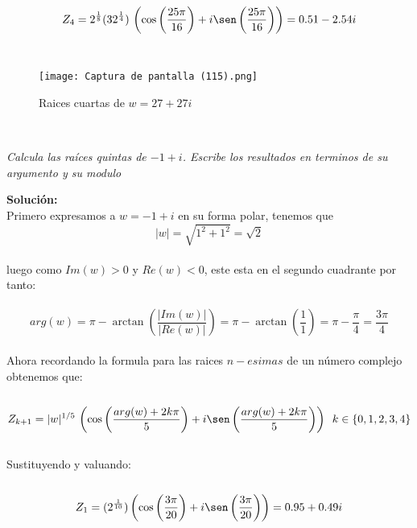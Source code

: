 \documentclass[11pt,letterpaper]{article}
\begin{document}
    \,\\
    \begin{equation*}
        Z_4=2^{\frac{1}{8}}(32^{\frac{1}{4}})\,\left(\cos\left(\frac{25\pi}{16}\right)+i\sen\left(\frac{25\pi}{16}\right)\right)=0.51-2.54i
    \end{equation*}
    \,\\
    \begin{figure}[htb]
    \centering
    \texttt{[image: Captura de pantalla (115).png]}
    \caption{Raices cuartas de $w=27+27i$}
    \label{Cono rebanado}
\end{figure}
\newpage
\,\\
\begin{tcolorbox}[
	title = \textcolor{black}{\textcolor{white}{Problema 6}},]
\textit{Calcula las ra\'ices quintas de $-1+i$. Escribe los resultados en terminos de su argumento
y su modulo
}
\end{tcolorbox}
\textbf{Soluci\'on:}
    \,\\
    Primero expresamos a $w=-1+i$ en su forma polar, tenemos que\,\\
    \begin{equation*}
        |w|=\sqrt{1^2+1^2}=\sqrt{2}
    \end{equation*}\,\\
    luego como $Im(w)>0$ y $Re(w)<0$, este esta en el segundo cuadrante por tanto:\,\\
    \,\\
    \begin{equation*}
        arg(w)=\pi-\arctan\left(\frac{|Im(w)|}{|Re(w)|}\right)=\pi-\arctan\left(\frac{1}{1}\right)=\pi-\frac{\pi}{4}=\frac{3\pi}{4}
    \end{equation*}\,\\
    Ahora recordando la formula para las raices $n-esimas$ de un n\'umero complejo obtenemos que:\,\\
    \,\\
    \begin{equation*}
        Z_{k+1}=|w|^{1/5}\,\left(\cos\left(\frac{arg(w)+2k\pi}{5}\right)+i\sen\left(\frac{arg(w)+2k\pi}{5}\right)\right)\,\,\,k\in\{0,1,2,3,4\}
    \end{equation*}\,\\
    Sustituyendo y valuando:\,\\
    \,\\
    \begin{equation*}
        Z_1=(2^{\frac{1}{10}})\left(\cos\left(\frac{3\pi}{20}\right)+i\sen\left(\frac{3\pi}{20}\right)\right)=0.95+0.49i
    \end{equation*}
\end{document}
